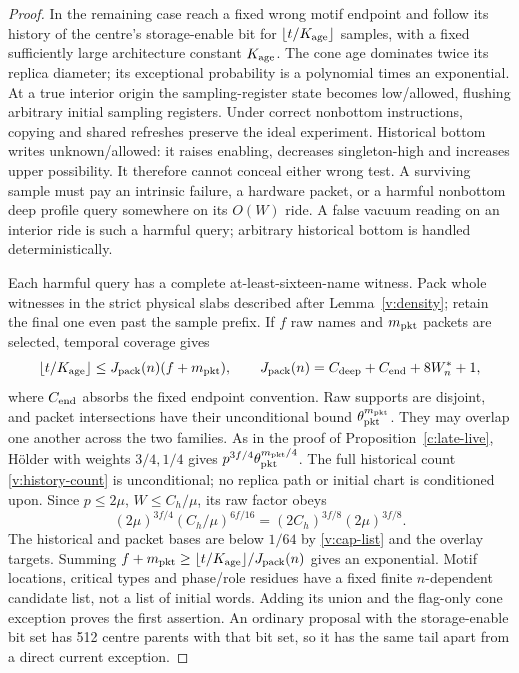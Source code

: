 \begin{proof}
In the remaining case reach a fixed wrong motif endpoint and follow its
history of the centre's storage-enable bit for \(\lfloor t/K_{\rm age}\rfloor\) samples,
with a fixed sufficiently large architecture constant \(K_{\rm age}\).
The cone age dominates twice its replica diameter; its exceptional
probability is a polynomial times an exponential. At a true interior
origin the sampling-register state becomes low/allowed, flushing arbitrary initial
sampling registers. Under correct nonbottom instructions, copying and shared
refreshes preserve the ideal experiment. Historical bottom writes
unknown/allowed: it raises enabling, decreases singleton-high and
increases upper possibility. It therefore cannot conceal either wrong
test. A surviving sample must pay an intrinsic failure, a hardware
packet, or a harmful nonbottom deep profile query somewhere on its
\(O(W)\) ride. A false vacuum reading on an interior ride is such a
harmful query; arbitrary historical bottom is handled deterministically.

Each harmful query has a complete at-least-sixteen-name witness.
Pack whole witnesses in the strict physical slabs described after
Lemma~\ref{v:density}; retain the final one even past the sample prefix.
If \(f\) raw names and \(m_{\rm pkt}\) packets are selected, temporal
coverage gives
\[
 \lfloor t/K_{\rm age}\rfloor\le
 J_{\rm pack}(n)(f+m_{\rm pkt}),\qquad
 J_{\rm pack}(n)=C_{\rm deep}+C_{\rm end}+8W_n^*+1,
\]
where \(C_{\rm end}\) absorbs the fixed endpoint convention.
Raw supports are disjoint, and packet intersections have their
unconditional bound \(\theta_{\rm pkt}^{m_{\rm pkt}}\).
They may overlap one another across the two families. As in the proof
of Proposition~\ref{c:late-live}, H\"older with weights \(3/4,1/4\) gives
\(p^{3f/4}\theta_{\rm pkt}^{m_{\rm pkt}/4}\).
The full historical count \eqref{v:history-count} is unconditional;
no replica path or initial chart is conditioned upon. Since
\(p\le2\mu\), \(W\le C_h/\mu\), its raw factor obeys
\[
 (2\mu)^{3f/4}(C_h/\mu)^{6f/16}
 =(2C_h)^{3f/8}(2\mu)^{3f/8}.
\]
The historical and packet bases are below \(1/64\) by
\eqref{v:cap-list} and the overlay targets. Summing
\(f+m_{\rm pkt}\ge\lfloor t/K_{\rm age}\rfloor/J_{\rm pack}(n)\)
gives an exponential. Motif locations, critical types and phase/role
residues have a fixed finite \(n\)-dependent candidate list, not a list
of initial words. Adding its union and the flag-only cone exception
proves the first assertion. An ordinary proposal with the storage-enable bit set has 512 centre parents with that bit set, so it has the same tail apart from a direct
current exception.


\end{proof}
